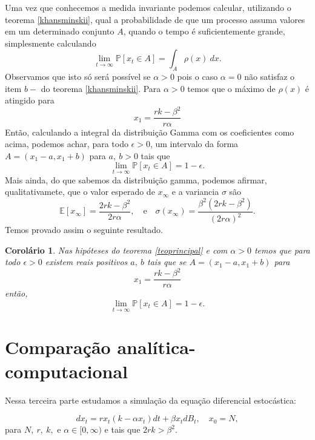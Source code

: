 \documentclass[12pt]{article}
\newtheorem{cor}[teo]{Corolário}
\newcommand{\mP }{\mathbb{P}}
\newcommand{\me}{\mathbb{E}}
\begin{document}
Uma vez que conhecemos a medida invariante podemos calcular, utilizando o teorema \ref{khansminskii}, qual a probabilidade de que um processo assuma valores em um determinado conjunto  $A$, quando o tempo é suficientemente grande, simplesmente calculando
\[
\lim_{t\rightarrow \infty}\mP[x_t\in A]=\int_A\rho(x)~dx.
\]
Observamos que isto só será possível se $\alpha>0$ pois o caso $\alpha=0$ não satisfaz o item $b-$ do teorema \ref{khansminskii}.
Para $\alpha>0$ temos que o máximo de $\rho(x)$ é atingido para 
\[
x_1=\frac{rk-\beta^2}{r\alpha}
\]
Então, calculando a integral da distribuição Gamma com os coeficientes como acima, podemos achar, para todo $\epsilon>0$, um intervalo da forma $A=(x_1-a,x_1+b)$ para $a,~b>0$ tais que
\[
\lim_{t\rightarrow \infty}\mP[x_t\in A]=1-\epsilon.
\]
Mais ainda, do que sabemos da distribuição gamma, podemos afirmar, qualitativamete, que o valor esperado de $x_\infty$ e a variancia $\sigma$ são 
\[
\me[x_\infty]=\frac{2rk-\beta^2}{2r\alpha},\quad\textrm{e}\quad\sigma(x_\infty)=\frac{\beta^2(2rk-\beta^2)}{(2r\alpha)^2}.
\]
Temos provado assim o seguinte resultado.
\begin{cor} Nas hipóteses do teorema \ref{teoprincipal} e com $\alpha>0$ temos  que para todo $\epsilon>0$ existem reais positivos $a,~b$ tais que se $A=(x_1-a,x_1+b)$ para 
\[
 x_1=\frac{rk-\beta^2}{r\alpha}
\]
então,
\[
\lim_{t\rightarrow \infty}\mP[x_t\in A]=1-\epsilon.
\]
\end{cor}
 

 

\section{Comparação analítica-computacional}

Nessa terceira parte estudamos a simulação da equação diferencial estocástica:

\[
dx_t=rx_t(k-\alpha x_t)dt+\beta x_tdB_t, \quad x_0=N,
\]
para $N,~r,~k,$ e $\alpha\in[0,\infty)$ e tais que $2rk>\beta^2$.\\
\end{document}
